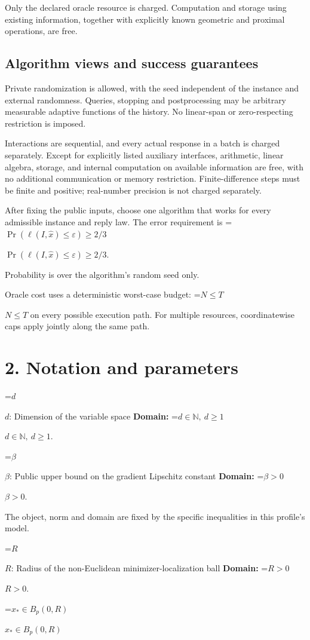 \documentclass[10pt,a4paper]{article}
\newcommand{\AtlasMath}[1]{\par\begingroup\centering\setbox0=\hbox{$\displaystyle #1$}\ifdim\wd0>1.4\linewidth\typeout{ATLAS WIDE FORMULA: \the\wd0}\fi\ifdim\wd0>\linewidth\resizebox{\linewidth}{!}{\box0}\else\box0\fi\par\endgroup}
\newcommand{\AtlasInlineMath}[1]{\begingroup\setbox0=\hbox{$#1$}\ifdim\wd0>.4\linewidth\endgroup\AtlasMath{#1}\else\endgroup$#1$\fi}
\begin{document}
Only the declared oracle resource is charged. Computation and storage using existing information, together with explicitly known geometric and proximal operations, are free.

\subsection{Algorithm views and success guarantees}
Private randomization is allowed, with the seed independent of the instance and external randomness. Queries, stopping and postprocessing may be arbitrary measurable adaptive functions of the history. No linear-span or zero-respecting restriction is imposed.

Interactions are sequential, and every actual response in a batch is charged separately. Except for explicitly listed auxiliary interfaces, arithmetic, linear algebra, storage, and internal computation on available information are free, with no additional communication or memory restriction. Finite-difference steps must be finite and positive; real-number precision is not charged separately.

After fixing the public inputs, choose one algorithm that works for every admissible instance and reply law. The error requirement is \AtlasInlineMath{\Pr(\ell(I,\widehat{x})\le \varepsilon)\ge2/3}.

Probability is over the algorithm's random seed only.

Oracle cost uses a deterministic worst-case budget: \AtlasInlineMath{N\le T} on every possible execution path. For multiple resources, coordinatewise caps apply jointly along the same path.

\section{2. Notation and parameters}
\AtlasInlineMath{d}: Dimension of the variable space \textbf{Domain:} \AtlasInlineMath{d\in\mathbb{N},\ d\ge1}.

\AtlasInlineMath{\beta}: Public upper bound on the gradient Lipschitz constant \textbf{Domain:} \AtlasInlineMath{\beta>0}.

The object, norm and domain are fixed by the specific inequalities in this profile's model.

\AtlasInlineMath{R}: Radius of the non-Euclidean minimizer-localization ball \textbf{Domain:} \AtlasInlineMath{R>0}.

\AtlasInlineMath{x_*\in B_p(0,R)}
\end{document}
